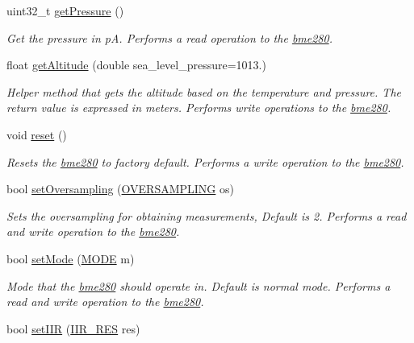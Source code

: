 \begin{DoxyCompactItemize}
uint32\+\_\+t \hyperlink{classbme280_a378fe9af89027338551cbef4361afec4}{get\+Pressure} ()
\begin{DoxyCompactList}\small\item\em Get the pressure in pA. Performs a read operation to the \hyperlink{classbme280}{bme280}. \end{DoxyCompactList}\item 
float \hyperlink{classbme280_ae73c3de91865386f94765e890aa5a5de}{get\+Altitude} (double sea\+\_\+level\+\_\+pressure=1013.)
\begin{DoxyCompactList}\small\item\em Helper method that gets the altitude based on the temperature and pressure. The return value is expressed in meters. Performs write operations to the \hyperlink{classbme280}{bme280}. \end{DoxyCompactList}\item 
\mbox{\label{classbme280_a81c999b8c2d4d1d6ed325019c7487da8}} 
void \hyperlink{classbme280_a81c999b8c2d4d1d6ed325019c7487da8}{reset} ()
\begin{DoxyCompactList}\small\item\em Resets the \hyperlink{classbme280}{bme280} to factory default. Performs a write operation to the \hyperlink{classbme280}{bme280}. \end{DoxyCompactList}\item 
bool \hyperlink{classbme280_a784c01efad1458fac6dc4f6940b4b3ff}{set\+Oversampling} (\hyperlink{bme280_8hpp_a8eb2f33991b63046b2887939a003837f}{O\+V\+E\+R\+S\+A\+M\+P\+L\+I\+NG} os)
\begin{DoxyCompactList}\small\item\em Sets the oversampling for obtaining measurements, Default is 2. Performs a read and write operation to the \hyperlink{classbme280}{bme280}. \end{DoxyCompactList}\item 
bool \hyperlink{classbme280_af0fc48370bf9144f610f84d548f6ee07}{set\+Mode} (\hyperlink{bme280_8hpp_a4fa86f9d2218a1052a2f337ec17984d3}{M\+O\+DE} m)
\begin{DoxyCompactList}\small\item\em Mode that the \hyperlink{classbme280}{bme280} should operate in. Default is normal mode. Performs a read and write operation to the \hyperlink{classbme280}{bme280}. \end{DoxyCompactList}\item 
bool \hyperlink{classbme280_a4fb6f417fb29b6c5a30519e2599ff489}{set\+I\+IR} (\hyperlink{bme280_8hpp_a67b0684f2b007e72879b3ec3928a4a40}{I\+I\+R\+\_\+\+R\+ES} res)

\end{DoxyCompactItemize}
